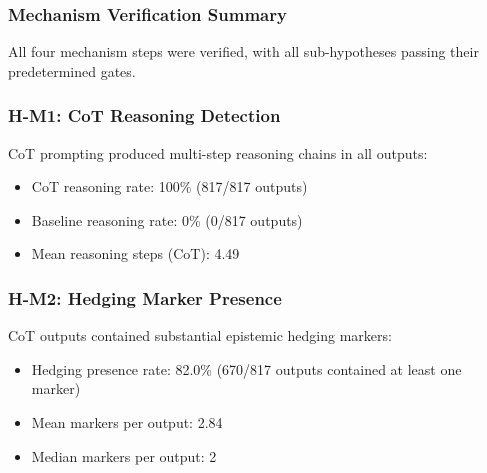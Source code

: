
\subsubsection{Mechanism Verification Summary}

All four mechanism steps were verified, with all sub-hypotheses passing their predetermined gates.

\begin{table}[htbp]
\centering
{}
\end{table}

\subsubsection{H-M1: CoT Reasoning Detection}

CoT prompting produced multi-step reasoning chains in all outputs:

\begin{itemize}
\item CoT reasoning rate: 100\% (817/817 outputs)
\item Baseline reasoning rate: 0\% (0/817 outputs)
\item Mean reasoning steps (CoT): 4.49
\end{itemize}

\subsubsection{H-M2: Hedging Marker Presence}

CoT outputs contained substantial epistemic hedging markers:

\begin{itemize}
\item Hedging presence rate: 82.0\% (670/817 outputs contained at least one marker)
\item Mean markers per output: 2.84
\item Median markers per output: 2
\end{itemize}

